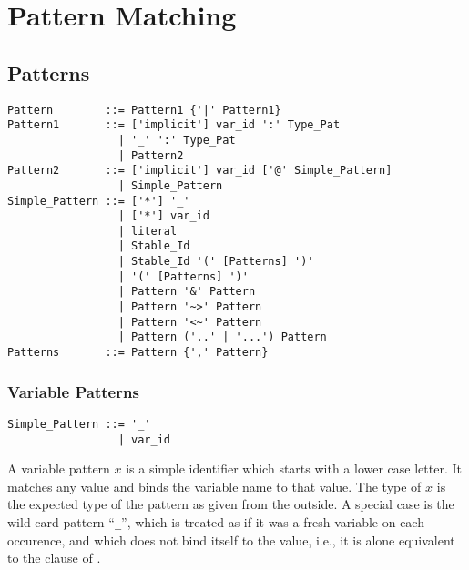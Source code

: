 
\chapter{Pattern Matching}
\label{sec:pattern-matching}






\section{Patterns}
\label{sec:patterns}

\syntax\begin{lstlisting}
Pattern        ::= Pattern1 {'|' Pattern1}
Pattern1       ::= ['implicit'] var_id ':' Type_Pat
                 | '_' ':' Type_Pat
                 | Pattern2
Pattern2       ::= ['implicit'] var_id ['@' Simple_Pattern]
                 | Simple_Pattern
Simple_Pattern ::= ['*'] '_'
                 | ['*'] var_id
                 | literal
                 | Stable_Id
                 | Stable_Id '(' [Patterns] ')' 
                 | '(' [Patterns] ')'
                 | Pattern '&' Pattern
                 | Pattern '~>' Pattern
                 | Pattern '<~' Pattern
                 | Pattern ('..' | '...') Pattern
Patterns       ::= Pattern {',' Pattern}
\end{lstlisting}






\subsection{Variable Patterns}
\label{sec:variable-patterns}

\syntax\begin{lstlisting}
Simple_Pattern ::= '_'
                 | var_id
\end{lstlisting}

A variable pattern $x$ is a simple identifier which starts with a lower case letter. It matches any value and binds the variable name to that value. The type of $x$ is the expected type of the pattern as given from the outside. A special case is the wild-card pattern ``\lstinline!_!'', which is treated as if it was a fresh variable on each occurence, and which does not bind itself to the value, i.e., it is alone equivalent to the  clause of . 







